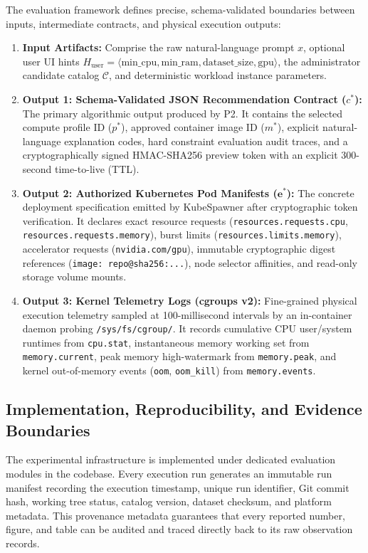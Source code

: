 The evaluation framework defines precise, schema-validated boundaries between inputs, intermediate contracts, and physical execution outputs:
\begin{enumerate}
    \item \textbf{Input Artifacts:} Comprise the raw natural-language prompt $x$, optional user UI hints $H_{\mathrm{user}} = \langle \mathrm{min\_cpu}, \mathrm{min\_ram}, \mathrm{dataset\_size}, \mathrm{gpu} \rangle$, the administrator candidate catalog $\mathcal{C}$, and deterministic workload instance parameters.
    \item \textbf{Output 1: Schema-Validated JSON Recommendation Contract ($c^*$):} The primary algorithmic output produced by P2. It contains the selected compute profile ID ($p^*$), approved container image ID ($m^*$), explicit natural-language explanation codes, hard constraint evaluation audit traces, and a cryptographically signed HMAC-SHA256 preview token with an explicit 300-second time-to-live (TTL).
    \item \textbf{Output 2: Authorized Kubernetes Pod Manifests ($\mathbf{e}^*$):} The concrete deployment specification emitted by KubeSpawner after cryptographic token verification. It declares exact resource requests (\texttt{resources.requests.cpu}, \texttt{resources.requests.memory}), burst limits (\texttt{resources.limits.memory}), accelerator requests (\texttt{nvidia.com/gpu}), immutable cryptographic digest references (\texttt{image: repo@sha256:...}), node selector affinities, and read-only storage volume mounts.
    \item \textbf{Output 3: Kernel Telemetry Logs (cgroups v2):} Fine-grained physical execution telemetry sampled at 100-millisecond intervals by an in-container daemon probing \texttt{/sys/fs/cgroup/}. It records cumulative CPU user/system runtimes from \texttt{cpu.stat}, instantaneous memory working set from \texttt{memory.current}, peak memory high-watermark from \texttt{memory.peak}, and kernel out-of-memory events (\texttt{oom}, \texttt{oom\_kill}) from \texttt{memory.events}.
\end{enumerate}

\subsection{Implementation, Reproducibility, and Evidence Boundaries}
\label{subsec:eval_environment}

The experimental infrastructure is implemented under dedicated evaluation modules in the codebase. Every execution run generates an immutable run manifest recording the execution timestamp, unique run identifier, Git commit hash, working tree status, catalog version, dataset checksum, and platform metadata. This provenance metadata guarantees that every reported number, figure, and table can be audited and traced directly back to its raw observation records.

